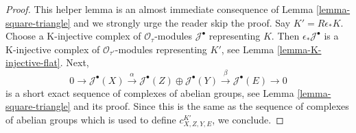 \documentclass[10pt,a4paper]{amsart}
\theoremstyle{plain}
\theoremstyle{definition}
\theoremstyle{remark}
\numberwithin{equation}{subsection}
\begin{document}
\begin{proof}
This helper lemma is an almost immediate consequence of
Lemma \ref{lemma-square-triangle}
and we strongly urge the reader skip the proof.
Say $K' = R\epsilon_*K$. Choose a K-injective complex of
$\mathcal{O}_\tau$-modules $\mathcal{J}^\bullet$ representing $K$.
Then $\epsilon_*\mathcal{J}^\bullet$ is a K-injective complex of
$\mathcal{O}_{\tau'}$-modules representing $K'$, see
Lemma \ref{lemma-K-injective-flat}. Next,
$$
0 \to
\mathcal{J}^\bullet(X) \xrightarrow{\alpha}
\mathcal{J}^\bullet(Z) \oplus
\mathcal{J}^\bullet(Y) \xrightarrow{\beta}
\mathcal{J}^\bullet(E)
\to 0
$$
is a short exact sequence of complexes of abelian groups, see
Lemma \ref{lemma-square-triangle} and its proof.
Since this is the same as the sequence of complexes of abelian
groups which is used to define $c^{K'}_{X, Z, Y, E}$, we conclude.
\end{proof}
\end{document}
